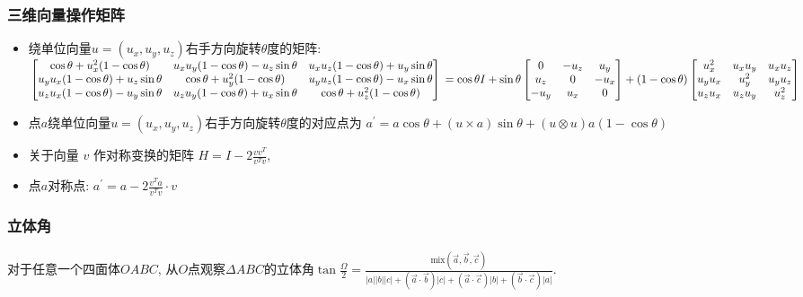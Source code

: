\documentclass[landscape,a4paper]{article}
\begin{document}
\begin{spacing}{0.3}
\begin{multicols}{2}
\subsubsection{三维向量操作矩阵}
  \begin{itemize}
  \item 绕单位向量$u = (u_x, u_y, u_z)$右手方向旋转$\theta$度的矩阵: \\
    $
    \begin{bmatrix}
      \cos\theta + u_x^2 (1 - \cos\theta)    &    u_x u_y (1 - \cos\theta) - u_z \sin\theta    &    u_x u_z (1 - \cos\theta) + u_y \sin\theta \\
    u_y u_x (1 - \cos\theta) + u_z \sin\theta    &    \cos\theta + u_y^2 (1 - \cos\theta)    &    u_y u_z (1 - \cos\theta) - u_x \sin\theta \\
    u_z u_x (1 - \cos\theta) - u_y \sin\theta    &    u_z u_y (1 - \cos\theta) + u_x \sin\theta    &    \cos\theta + u_z^2 (1 - \cos\theta)
  \end{bmatrix} \\
  = \cos\theta I
  + \sin\theta
  \begin{bmatrix}
    0    &    -u_z    &    u_y \\
    u_z    &    0    &    -u_x \\
    -u_y    &    u_x    &    0
  \end{bmatrix}
  + (1 - \cos\theta)
  \begin{bmatrix}
    u_x ^ 2    &    u_x u_y    &    u_x u_z \\
    u_y u_x    &    u_y ^ 2    &    u_y u_z \\
    u_z u_x    &    u_z u_y    &    u_z ^ 2
  \end{bmatrix}
  $
  \item 点$a$绕单位向量$u = (u_x, u_y, u_z)$右手方向旋转$\theta$度的对应点为
  $a^\prime = a \cos\theta + (u \times a) \sin\theta + (u \otimes u) a (1 - \cos\theta)$
  \item 关于向量 $v$ 作对称变换的矩阵 $H = I - 2 \frac{v v^T}{v^T v}$,
  \item 点$a$对称点: $a^\prime = a - 2 \frac{v^T a}{v^T v} \cdot v$
  \end{itemize}
\subsubsection{立体角}
  对于任意一个四面体$OABC$,
  从$O$点观察$\Delta ABC$的立体角$\tan{\frac{\Omega}{2}} =
  \frac{\textrm{mix}(\overrightarrow{a}, \overrightarrow{b}, \overrightarrow{c}) }{
  |a||b||c|
  + (\overrightarrow{a} \cdot \overrightarrow{b}) |c|
  + (\overrightarrow{a} \cdot \overrightarrow{c}) |b|
  + (\overrightarrow{b} \cdot \overrightarrow{c}) |a|
}$.
	

\end{multicols}
\end{spacing}
\end{document}
